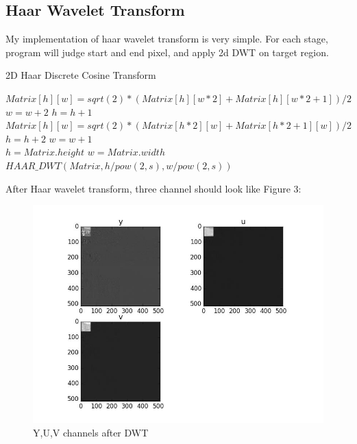 \documentclass[UTF8, letterpaper, 14pt]{article}
\begin{document}
\subsection{Haar Wavelet Transform}
My implementation of haar wavelet transform is very simple. For each stage, program will judge start and end pixel, and apply 2d DWT on target region.
\begin{spacing}{0.7}
\begin{algorithm}[htb]
\caption{2D Haar Discrete Cosine Transform}
   \begin{algorithmic}[1]
        			\State $Matrix[h][w] = sqrt(2) * (Matrix[h][w*2] + Matrix[h][w*2+1]) / 2$
        			\State $w = w + 2$
        		\EndFor
        		\State $h = h + 1$
        \EndFor
        			\State $Matrix[h][w] = sqrt(2) * (Matrix[h*2][w] + Matrix[h*2+1][w]) / 2$
        			\State $h = h + 2$
        		\EndFor
        		\State $w = w + 1$
        \EndFor
       \EndFunction
       \\
      	\State $ h = Matrix.height$
      	\State $ w = Matrix.width$
        		\State $HAAR\_DWT( Matrix, h /pow(2,s), w/pow(2,s))$
        	\EndFor
      \EndFunction
\end{algorithmic}
\end{algorithm}
\end{spacing}
After Haar wavelet transform, three channel should look like Figure 3:
\begin{figure}[htb]
\begin{center}
\includegraphics[scale=0.5]{dwt}
\caption[12pt]{Y,U,V channels after DWT} \label{tab:title} 
\end{center}
\end{figure}
\end{document}
